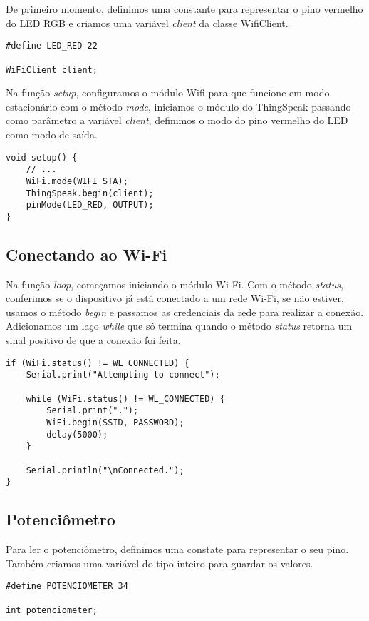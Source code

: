 De primeiro momento, definimos uma constante para representar o pino vermelho do LED RGB e criamos uma variável \textit{client} da classe WifiClient.

\begin{lstlisting}
#define LED_RED 22

WiFiClient client;
\end{lstlisting}

Na função \textit{setup}, configuramos o módulo Wifi para que funcione em modo estacionário com o método \textit{mode}, iniciamos o módulo do ThingSpeak passando como parâmetro a variável \textit{client}, definimos o modo do pino vermelho do LED como modo de saída.

\begin{lstlisting}
void setup() {
    // ...
    WiFi.mode(WIFI_STA);
    ThingSpeak.begin(client);
    pinMode(LED_RED, OUTPUT);
}
\end{lstlisting}

\subsection{Conectando ao Wi-Fi}

Na função \textit{loop}, começamos iniciando o módulo Wi-Fi. Com o método \textit{status}, conferimos se o dispositivo já está conectado a um rede Wi-Fi, se não estiver, usamos o método \textit{begin} e passamos as credenciais da rede para realizar a conexão. Adicionamos um laço \textit{while} que só termina quando o método \textit{status} retorna um sinal positivo de que a conexão foi feita.

\begin{lstlisting}
if (WiFi.status() != WL_CONNECTED) {
    Serial.print("Attempting to connect");
    
    while (WiFi.status() != WL_CONNECTED) {
        Serial.print(".");
        WiFi.begin(SSID, PASSWORD);
        delay(5000);
    }
    
    Serial.println("\nConnected.");
}
\end{lstlisting}

\subsection{Potenciômetro}

Para ler o potenciômetro, definimos uma constate para representar o seu pino. Também criamos uma variável do tipo inteiro para guardar os valores.
\begin{lstlisting}
#define POTENCIOMETER 34

int potenciometer;
\end{lstlisting}

